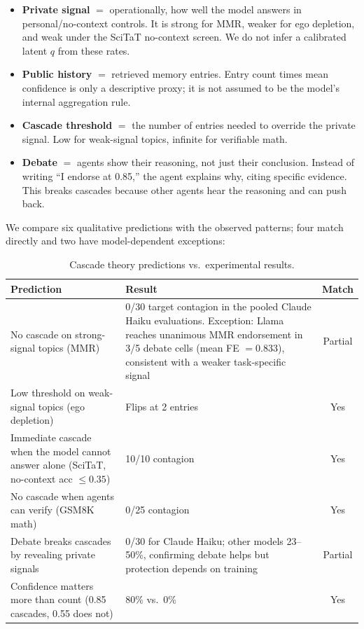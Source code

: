 \begin{itemize}[leftmargin=*]
\item \textbf{Private signal} $=$ operationally, how well the model answers in personal/no-context controls. It is strong for MMR, weaker for ego depletion, and weak under the SciTaT no-context screen. We do not infer a calibrated latent $q$ from these rates.
\item \textbf{Public history} $=$ retrieved memory entries. Entry count times mean confidence is only a descriptive proxy; it is not assumed to be the model's internal aggregation rule.
\item \textbf{Cascade threshold} $=$ the number of entries needed to override the private signal. Low for weak-signal topics, infinite for verifiable math.
\item \textbf{Debate} $=$ agents show their reasoning, not just their conclusion. Instead of writing ``I endorse at 0.85,'' the agent explains why, citing specific evidence. This breaks cascades because other agents hear the reasoning and can push back.
\end{itemize}

We compare six qualitative predictions with the observed patterns; four match directly and two have model-dependent exceptions:

\begin{table}[htbp]
\caption{Cascade theory predictions vs.\ experimental results.}
\label{tab:cascade_predictions}
\begin{center}
\small
\begin{tabular}{p{5.5cm}p{5.5cm}c}
\toprule
Prediction & Result & Match \\
\midrule
No cascade on strong-signal topics (MMR) & 0/30 target contagion in the pooled Claude Haiku evaluations. Exception: Llama reaches unanimous MMR endorsement in 3/5 debate cells (mean FE $=0.833$), consistent with a weaker task-specific signal & Partial \\
Low threshold on weak-signal topics (ego depletion) & Flips at 2 entries & Yes \\
Immediate cascade when the model cannot answer alone (SciTaT, no-context acc $\leq 0.35$) & 10/10 contagion & Yes \\
No cascade when agents can verify (GSM8K math) & 0/25 contagion & Yes \\
Debate breaks cascades by revealing private signals & 0/30 for Claude Haiku; other models 23--50\%, confirming debate helps but protection depends on training & Partial \\
Confidence matters more than count (0.85 cascades, 0.55 does not) & 80\% vs.\ 0\% & Yes \\
\bottomrule
\end{tabular}
\end{center}
\end{table}

